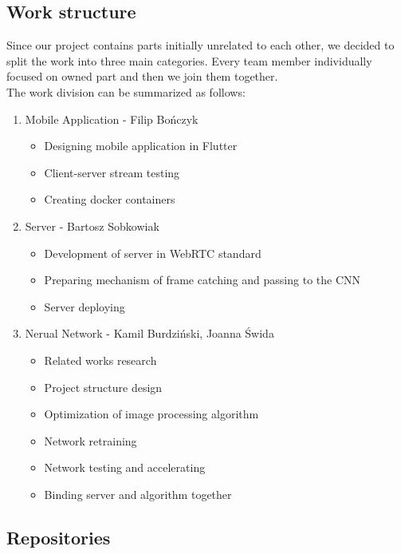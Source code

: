 \documentclass[../Main.tex]{subfiles}
\begin{document}
\subsection{Work structure}
Since our project contains parts initially unrelated to each other, we decided to split the work into three main categories. Every team member individually focused on owned part and then we join them together. \\
The work division can be summarized as follows:
\begin{enumerate}
    \item Mobile Application - Filip Bończyk
        \begin{itemize}
            \item Designing mobile application in Flutter
            \item Client-server stream testing 
            \item Creating docker containers
        \end{itemize}
    \item Server - Bartosz Sobkowiak
        \begin{itemize}
            \item Development of server in WebRTC standard
            \item Preparing mechanism of frame catching and passing to the CNN
            \item Server deploying
        \end{itemize}
    \item Nerual Network - Kamil Burdziński, Joanna Świda
        \begin{itemize}
            \item Related works research
            \item Project structure design
            \item Optimization of image processing algorithm
            \item Network retraining
            \item Network testing and accelerating
            \item Binding server and algorithm together
        \end{itemize}
\end{enumerate}

\newpage
\subsection{Repositories}
\end{document}
